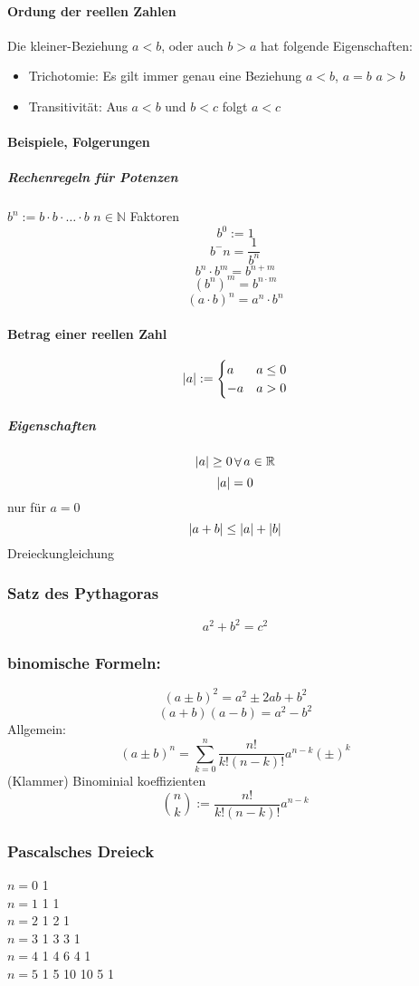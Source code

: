 \documentclass[a4paper]{scrartcl}
\DeclarePairedDelimiter\abs{\lvert}{\rvert}%
\DeclareMathOperator{\Forall}{\forall}
\begin{document}
\paragraph{Ordung der reellen Zahlen}
\label{sec-2-2-1-3}
Die kleiner-Beziehung $a<b$, oder auch $b > a$ hat folgende Eigenschaften:
\begin{itemize}
\item Trichotomie: Es gilt immer genau eine Beziehung
$a < b$, $a = b$ $a > b$
\item Transitivität: Aus $a < b$ und $b < c$ folgt $a < c$
\end{itemize}
\paragraph{Beispiele, Folgerungen}
\label{sec-2-2-1-4}
\subparagraph{Rechenregeln für Potenzen}
\label{sec-2-2-1-4-1}
$b^n := b\cdot b \cdot \ldots \cdot b$ $n\in \mathbb{N}$ Faktoren
\[b^0 := 1\]
\[b^-n = \frac{1}{b^n}\]
\[b^n \cdot b^m = b^{n+m}\]
\[(b^n)^m = b^{n\cdot m}\]
\[(a\cdot b)^n = a^n \cdot b^n\]
\paragraph{Betrag einer reellen Zahl}
\label{sec-2-2-1-5}
\[\abs{a} := \begin{cases} a & a \leq 0 \\ -a & a > 0 \end{cases} \]
\subparagraph{Eigenschaften}
\label{sec-2-2-1-5-1}
\[\abs{a} \geq 0 \Forall a\in\mathbb{R}\]
\[\abs{a} = 0\] nur für $a = 0$
\[\abs{a + b} \leq \abs{a} + \abs{b}\] Dreieckungleichung
\subsubsection{Satz des Pythagoras}
\label{sec-2-2-2}
\[a^2 + b^2 = c^2\]
\subsubsection{binomische Formeln:}
\label{sec-2-2-3}
\[(a\pm b)^2 = a^2 \pm 2 a b + b^2\]
\[(a+b)(a-b) = a^2 - b^2\]
Allgemein:
\[(a \pm b)^n = \sum_{k=0}^n{\frac{n!}{k!(n-k)!}a^{n-k}(\pm)^k}\] (Klammer) Binominial koeffizienten
\[\binom{n}{k} := \frac{n!}{k!(n-k)!}a^{n-k}\]

\subsubsection{Pascalsches Dreieck}
\label{sec-2-2-4}
\begin{center}
$n = 0$ 1 \\
$n = 1$ 1 1 \\
$n = 2$ 1 2 1 \\
$n = 3$ 1 3 3 1 \\
$n = 4$ 1 4 6 4 1 \\
$n = 5$ 1 5 10 10 5 1 \\
\end{center}
\end{document}
